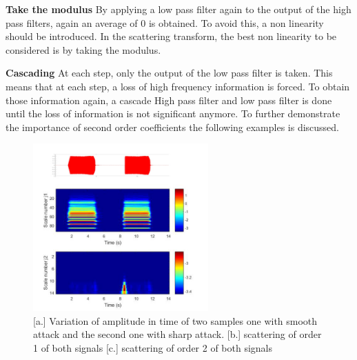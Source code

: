 \documentclass[hidelinks,12pt]{report}
\begin{document}
\textbf{Take the modulus}
By applying a low pass filter again to the output of the high pass filters, again an average of 0 is obtained. To avoid this, a non linearity should be introduced. In the scattering transform, the best non linearity to be considered is by taking the modulus.\par
\textbf{Cascading}
At each step, only the output of the low pass filter is taken. This means that at each step, a loss of high frequency information is forced. To obtain those information again, a cascade High pass filter and low pass filter is done until the loss of information is not significant anymore. To further demonstrate the importance of second order coefficients the following examples is discussed.\par
\begin{figure}[t!]
  
  \centering
	    \includegraphics[width=0.6\textwidth]{att}
    \caption{[a.] Variation of amplitude in time of two samples one with smooth attack and the second one with sharp attack. [b.] scattering of order 1 of both signals [c.] scattering of order 2 of both signals }
    \label{attack}
\end{figure}
\end{document}
